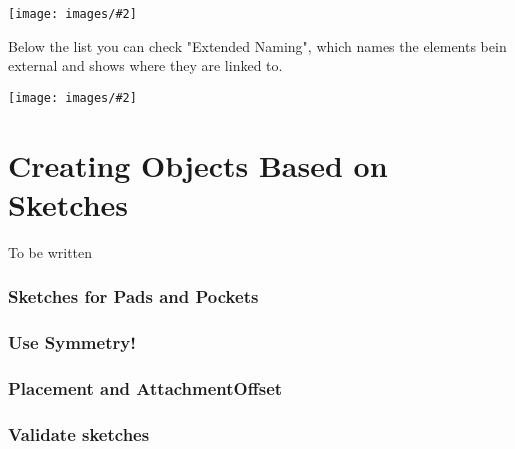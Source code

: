 \documentclass[12pt,titlepage]{article}
\newcommand{\img}[2]{\vspace{2ex}\noindent\texttt{[image: images/\#2]}}
\let\partOrigin\part
\renewcommand\part{\newpage\partOrigin}
\begin{document}
\begin {itemize}
\img{scale=0.8}{ExternalListOfElements}


Below the list you can check "Extended
Naming", which names the elements bein external and shows where they are linked to.

\img{scale=0.8}{ExternalListOfElementsExtended}

\newpage
\part{Creating Objects Based on Sketches}


To be written

\section{Sketches for Pads and Pockets}
\section{Use Symmetry!}
\section{Placement and AttachmentOffset}
\label{SketchPlacement}

\section{Validate sketches}
\label{ValidateSketch}
\newpage
\begin{appendix}

\end{appendix}
\end{itemize}
\end{document}
